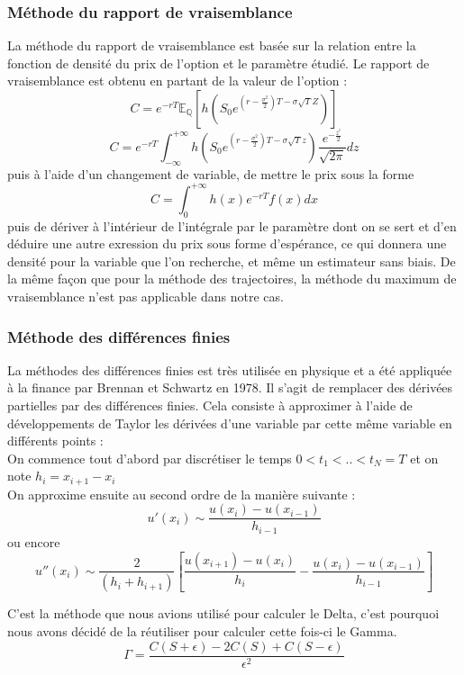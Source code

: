 \documentclass[french,12pt,a4paper]{article}
\begin{document}
\subsubsection{Méthode du rapport de vraisemblance}
La méthode du rapport de vraisemblance est basée sur la relation entre la fonction de densité du prix de l'option et le paramètre étudié. Le rapport de vraisemblance est obtenu en partant de la  valeur de l'option : 
$$ C =  e^{-rT} \mathbb{E}_{\mathbb{Q}} \left [ h(S_0 e^{ ( r - \frac{\sigma^2}{2} )T - \sigma \sqrt{T} Z }) \right ] $$
$$ C =  e^{-rT} \int_{- \infty}^{+ \infty} h(S_0 e^{ ( r - \frac{\sigma^2}{2} )T - \sigma \sqrt{T} z }) \frac{e^{- \frac{z^²}{2}}}{\sqrt{2 \pi}} dz $$
puis à l'aide d'un changement de variable, de mettre le prix sous la forme 
$$ C = \int_{0}^{+\infty} h(x)e^{-rT}f(x)dx  $$
puis de dériver à l'intérieur de l'intégrale par le paramètre dont on se sert et d'en déduire une autre exression du prix sous forme d'espérance, ce qui donnera une densité pour la variable que l'on recherche, et même un estimateur sans biais.
De la même façon que pour la méthode des trajectoires, la méthode du maximum de vraisemblance n'est pas applicable dans notre cas.
\subsubsection{Méthode des différences finies}
La méthodes des différences finies est très utilisée en physique et a été appliquée à la finance par Brennan et Schwartz en 1978. Il s'agit de remplacer des dérivées partielles par des différences finies. Cela consiste à approximer à l'aide de développements de Taylor les dérivées d'une variable par cette même variable en différents points : 
\\ On commence tout d'abord par discrétiser le temps $ 0 < t_1 < .. < t_N = T $ et on note $h_i = x_{i+1}-x_i $ 
\\ On approxime ensuite au second ordre de la manière suivante : 
$$ u'(x_{i}) \sim \frac{u(x_{i})-u(x_{i-1})}{h_{i-1}}  $$
ou encore 
$$ u''(x_{i}) \sim \frac{2}{(h_i + h_{i+1})} \left [ \frac{u(x_{i+1})-u(x_i)}{h_i} - \frac{u(x_i)-u(x_{i-1})}{h_{i-1}} \right ]   $$

C'est la méthode que nous avions utilisé pour calculer le Delta, c'est pourquoi nous avons décidé de la réutiliser pour calculer cette fois-ci le Gamma.
$$ \Gamma = \frac{C(S+ \epsilon )-2 C(S) + C(S-\epsilon)}{\epsilon^2} $$
\end{document}
